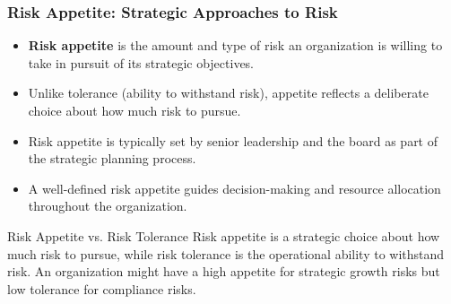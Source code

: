 \documentclass{beamer}
\begin{document}
        \begin{frame}
        \frametitle{Risk Appetite: Strategic Approaches to Risk}
        \begin{itemize}
          \item \textbf{Risk appetite} is the amount and type of risk an organization is willing to take in pursuit of its strategic objectives.
          \item Unlike tolerance (ability to withstand risk), appetite reflects a deliberate choice about how much risk to pursue.
          \item Risk appetite is typically set by senior leadership and the board as part of the strategic planning process.
          \item A well-defined risk appetite guides decision-making and resource allocation throughout the organization.
        \end{itemize}
        
        \begin{alertblock}{Risk Appetite vs. Risk Tolerance}
        Risk appetite is a strategic choice about how much risk to pursue, while risk tolerance is the operational ability to withstand risk. An organization might have a high appetite for strategic growth risks but low tolerance for compliance risks.
        \end{alertblock}
        \end{frame}
\end{document}
